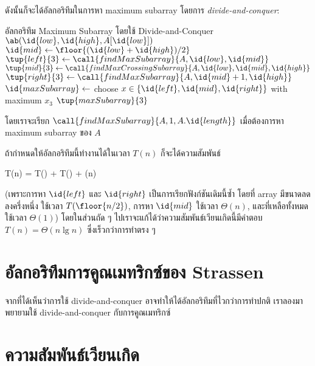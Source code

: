 ดังนั้นก็จะได้อัลกอริทึมในการหา maximum subarray โดยการ \emph{divide-and-conquer}:
\begin{icodebox}{อัลกอริทึม Maximum Subarray โดยใช้ Divide-and-Conquer}
            \State \Return $\ab(\id{low}, \id{high}, A[\id{low}])$
        \EndIf
        \State $\id{mid} \gets \floor{(\id{low} + \id{high})/2}$
        \State $\tup{left}{3} \gets \call{findMaxSubarray}{A, \id{low}, \id{mid}}$
        \State $\tup{mid}{3} \gets \call{findMaxCrossingSubarray}{A, \id{low}, \id{mid}, \id{high}}$
        \State $\tup{right}{3} \gets \call{findMaxSubarray}{A, \id{mid}+1, \id{high}}$
        \State $\id{maxSubarray} \gets$ choose $x \in \{\id{left}, \id{mid}, \id{right}\}$ with maximum $x_3$
        \State \Return $\tup{maxSubarray}{3}$
    \EndFunction
\end{icodebox}
โดยเราจะเรียก $\call{findMaxSubarray}{A, 1, A.\id{length}}$ เมื่อต้องการหา maximum subarray ของ $A$ 

ถ้ากำหนดให้อัลกอริทึมนี้ทำงานได้ในเวลา $T(n)$ ก็จะได้ความสัมพันธ์
\begin{eqnobox}
    T(n) = T() + T() + \Theta(n)
\end{eqnobox}
(เพราะการหา $\id{left}$ และ $\id{right}$ เป็นการเรียกฟังก์ชันเดิมนี้ซ้ำ โดยที่ array มีขนาดลดลงครึ่งหนึ่ง ใช้เวลา $T(\floor{n/2})$, การหา $\id{mid}$ ใช้เวลา $\Theta(n)$, และที่เหลือทั้งหมดใช้เวลา $\Theta(1)$) โดยในส่วนถัด ๆ ไปเราจะแก้ได้ว่าความสัมพันธ์เวียนเกิดนี้มีคำตอบ $T(n) = \Theta(n\lg n)$ ซึ่งเร็วกว่าการทำตรง ๆ

\section{อัลกอริทึมการคูณเมทริกซ์ของ Strassen}

จากที่ได้เห็นว่าการใช้ divide-and-conquer อาจทำให้ได้อัลกอริทึมที่ไวกว่าการทำปกติ เราลองมาพยายามใช้ divide-and-conquer กับการคูณเมทริกซ์

\section{ความสัมพันธ์เวียนเกิด}